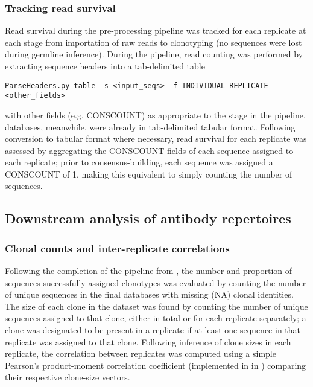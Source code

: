 \subsubsection{Tracking read survival}
\label{sec:methods_comp_igpreproc_readsurv}

Read survival during the pre-processing pipeline was tracked for each replicate at each stage from importation of raw reads to clonotyping (no sequences were lost during germline inference). During the  pipeline, read counting was performed by extracting sequence headers into a tab-delimited table

\begin{lstlisting}
ParseHeaders.py table -s <input_seqs> -f INDIVIDUAL REPLICATE <other_fields>
\end{lstlisting}  

\noindent with other fields (e.g. CONSCOUNT) as appropriate to the stage in the pipeline.  databases, meanwhile, were already in tab-delimited tabular format. Following conversion to tabular format where necessary, read survival for each replicate was assessed by aggregating the CONSCOUNT fields of each sequence assigned to each replicate; prior to consensus-building, each sequence was assigned a CONSCOUNT of 1, making this equivalent to simply counting the number of sequences.

\subsection{Downstream analysis of antibody repertoires}
\label{sec:methods_comp_igdownstream}

\subsubsection{Clonal counts and inter-replicate correlations}
\label{sec:methods_comp_igdownstream_clones}

Following the completion of the pipeline from , the number and proportion of sequences successfully assigned clonotypes was evaluated by counting the number of unique sequences in the final  databases with missing (NA) clonal identities. The size of each clone in the dataset was found by counting the number of unique sequences assigned to that clone, either in total or for each replicate separately; a clone was designated to be present in a replicate if at least one sequence in that replicate was assigned to that clone. Following inference of clone sizes in each replicate, the correlation between replicates was computed using a simple Pearson's product-moment correlation coefficient (implemented in  in ) comparing their respective clone-size vectors.

